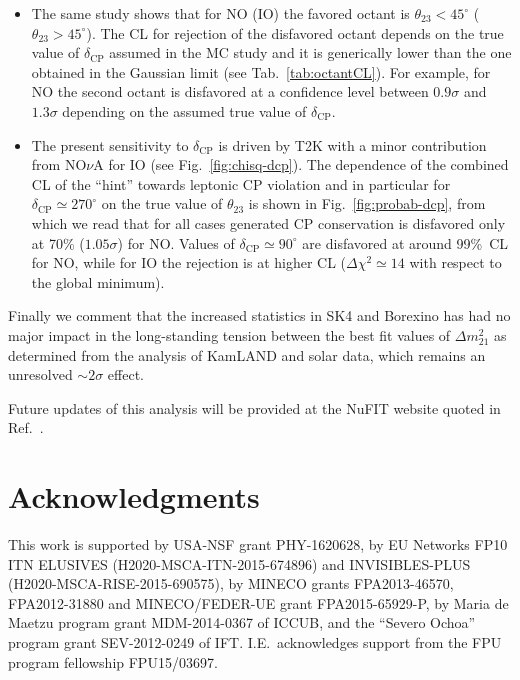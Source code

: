 \documentclass[a4paper, 11pt]{article}
\newcommand{\Dmq}{\Delta m^2}
\begin{document}
\begin{itemize}
\item The same study shows that for NO (IO) the favored octant is
  $\theta_{23}<45^\circ$ ($\theta_{23}>45^\circ$).  The CL for
  rejection of the disfavored octant depends on the true value of
  $\delta_\text{CP}$ assumed in the MC study and it is generically
  lower than the one obtained in the Gaussian limit (see
  Tab.~\ref{tab:octantCL}). For example, for NO the second octant is
  disfavored at a confidence level between $0.9\sigma$ and $1.3\sigma$
  depending on the assumed true value of $\delta_\text{CP}$.

\item The present sensitivity to $\delta_\text{CP}$ is driven by T2K
  with a minor contribution from NO$\nu$A for IO (see
  Fig.~\ref{fig:chisq-dcp}). The dependence of the combined CL of the
  ``hint'' towards leptonic CP violation and in particular for
  $\delta_\text{CP} \simeq 270^\circ$ on the true value of
  $\theta_{23}$ is shown in Fig.~\ref{fig:probab-dcp}, from which we
  read that for all cases generated CP conservation is disfavored only
  at 70\% ($1.05\sigma$) for NO.  Values of $\delta_\text{CP} \simeq
  90^\circ$ are disfavored at around 99\%~CL for NO, while for IO the
  rejection is at higher CL ($\Delta\chi^2 \simeq 14$ with respect to
  the global minimum).
\end{itemize}
%
Finally we comment that the increased statistics in SK4 and Borexino
has had no major impact in the long-standing tension between the best
fit values of $\Dmq_{21}$ as determined from the analysis of KamLAND
and solar data, which remains an unresolved $\sim 2\sigma$ effect.

Future updates of this analysis will be provided at the NuFIT website
quoted in Ref.~\cite{nufit}.

\section*{Acknowledgments}

This work is supported by USA-NSF grant PHY-1620628, by EU Networks
FP10 ITN ELUSIVES (H2020-MSCA-ITN-2015-674896) and INVISIBLES-PLUS
(H2020-MSCA-RISE-2015-690575), by MINECO grants FPA2013-46570,
FPA2012-31880 and MINECO/FEDER-UE grant FPA2015-65929-P, by Maria de
Maetzu program grant MDM-2014-0367 of ICCUB, and the ``Severo Ochoa''
program grant SEV-2012-0249 of IFT. I.E.\ acknowledges support from
the FPU program fellowship FPU15/03697.

\appendix
\end{document}
